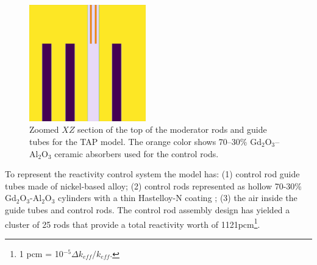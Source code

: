 \documentclass[12pt]{article} %
\begin{document}
\begin{figure}[htp!] %
  \centering
		  \includegraphics[width=0.45\textwidth]{tap_elev_view_zoomed.png}
		 \vspace{-0.2in}
  \caption{Zoomed $XZ$ section of the top of the moderator rods and guide 
  tubes for the \gls{TAP} model. The orange color shows 70–30\% 
  Gd$_2$O$_3$–Al$_2$O$_3$ ceramic absorbers used for the control rods.}
  \label{fig:tap-serpent-elev-zoom}
\end{figure}

To represent the reactivity control system the model has: (1) control rod 
guide tubes made of nickel-based alloy; (2) control rods represented as hollow 
70-30\% Gd$_2$O$_3$-Al$_2$O$_3$ cylinders with a thin Hastelloy-N coating 
\cite{betzler_assessment_2017}; (3) the air inside the guide tubes and 
control rods. The control rod assembly design has yielded a cluster of 25 rods 
that provide a total reactivity worth of 1121pcm\footnote{ 1 pcm = 
10$^{-5}\Delta k_{eff}/k_{eff}$.}.
\end{document}
